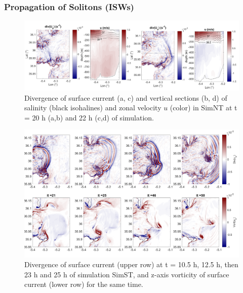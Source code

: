 \subsubsection{Propagation of Solitons (ISWs)}

\begin{figure}[!h]
 \centering
 \includegraphics[width=1.\textwidth]{./GBR3D/coupesISW_ME2-2.png}
 \caption {Divergence of surface current (a, c) and vertical sections (b, d) of salinity (black isohalines) and zonal velocity $u$ (color) in SimNT at t = 20 h (a,b) and 22 h (c,d) of simulation.}
  \label{FigISWNT}
\end{figure}

\begin{figure}[!h]
 \centering
\includegraphics[width=\linewidth]{./GBR3D/FigTourbVE2.png}
 \caption {Divergence of surface current (upper row) at t = 10.5 h, 12.5 h, then 23 h and 25 h of simulation SimST, and z-axis vorticity of surface current (lower row) for the same time.}
 \label{FigeddGBR3D}
\end{figure}

